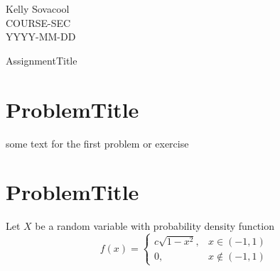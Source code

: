 \documentclass[12pt]{article}
\begin{document}
\begin{flushleft}
Kelly Sovacool\\
COURSE-SEC\\
YYYY-MM-DD\\
\end{flushleft}

\begin{center}
\LARGE{AssignmentTitle}
\end{center}

\section{ProblemTitle}
some text for the first problem or exercise

\section{ProblemTitle}
Let $X$ be a random variable with probability density function
        \begin{equation*}
                f(x)=\begin{cases}c\sqrt{1-x^2},&x\in(-1,1)\\ 0,&x\notin(-1,1)\end{cases}
        \end{equation*}
\end{document}
